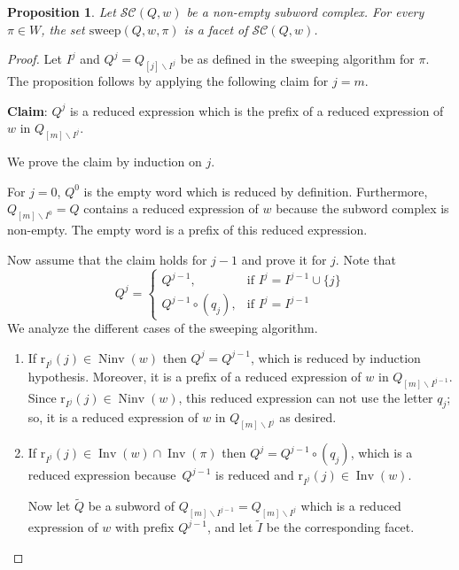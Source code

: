 \documentclass{amsart}
\newtheorem{proposition}[theorem]{Proposition}
\theoremstyle{definition}
\DeclareMathOperator{\Inv}{Inv} %
\DeclareMathOperator{\Ninv}{Ninv} %
\newcommand{\subwordComplex}{\mathcal{SC}} %
\newcommand{\rootFunction}[2]{\mathrm{r}_{#1}(#2)} %
\newcommand{\sweepingAlgorithm}{\mathrm{sweep}} %
\begin{document}
\begin{proposition}
\label{prop_sweeping1}
    Let $\subwordComplex(Q,w)$ be a non-empty subword complex.
    For every $\pi \in W$, the set $\sweepingAlgorithm(Q,w,\pi)$ is a facet of $\subwordComplex(Q,w)$.
\end{proposition}

\begin{proof}
    Let $I^j$ and $Q^j=Q_{[j]\smallsetminus I^j}$ be as defined in the sweeping algorithm for $\pi$. 
    The proposition follows by applying the following claim for $j=m$.
    \smallskip
    
    {\bf Claim}: $Q^j$ is a reduced expression which is the prefix of a reduced expression of $w$ in $Q_{[m]\smallsetminus I^j}$.

    \smallskip
    We prove the claim by induction on $j$.

    For $j=0$, $Q^0$ is the empty word which is reduced by definition.
    Furthermore, $Q_{[m]\smallsetminus I^0 }=Q$ contains a reduced expression of $w$ because the subword complex is non-empty.
The empty word is a prefix of this reduced expression. 

    Now assume that the claim holds for $j-1$ and prove it for $j$.
    Note that 
    \begin{equation}
         Q^j = 
  \begin{cases}
    Q^{j-1}, & \text{if } I^j=I^{j-1}\cup \{j\} \\
    Q^{j-1}\circ (q_j), & \text{if } I^j=I^{j-1}
  \end{cases}
    \end{equation}    
    We analyze the different cases of the sweeping algorithm.
    \begin{enumerate}
    \item If $\rootFunction{I^j}{j}\in \Ninv(w)$ then 
    $Q^j=Q^{j-1}$, which is reduced by induction hypothesis.
    Moreover, it is a prefix of a reduced expression of $w$ in $Q_{[m]\smallsetminus I^{j-1}}$.
    Since $\rootFunction{I^j}{j}\in \Ninv(w)$, this reduced expression can not use the letter $q_j$; so, it is a reduced expression of $w$ in $Q_{[m]\smallsetminus I^{j}}$ as desired.
    \item If $\rootFunction{I^j}{j}\in \Inv(w) \cap \Inv (\pi)$ then $Q^j= Q^{j-1}\circ (q_j)$, which is a reduced expression because~$Q^{j-1}$ is reduced and $\rootFunction{I^j}{j}\in \Inv(w)$.
    
    Now let $\widetilde Q$ be a subword of $Q_{[m]\smallsetminus I^{j-1}}=Q_{[m]\smallsetminus I^{j}}$ which is a reduced expression of $w$ with prefix $Q^{j-1}$, and let $\widetilde I$ be the corresponding facet.
    

\end{enumerate}
\end{proof}
\end{document}
